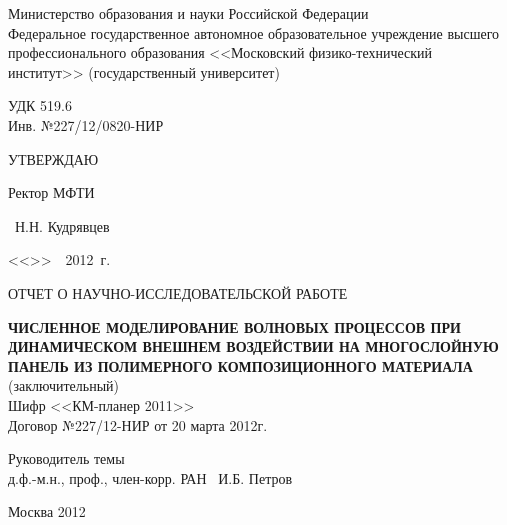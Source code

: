 \begin{titlepage}
\newpage

\begin{center}
Министерство образования и науки Российской Федерации\\
Федеральное государственное автономное образовательное учреждение высшего профессионального образования <<Московский физико-технический институт>> (государственный университет)\\
\end{center}

\vspace{0.5em}

\noindent
\begin{minipage}[t]{0.5\textwidth}
УДК 519.6\\
Инв. №227/12/0820-НИР
\end{minipage}
\begin{minipage}[t]{0.5\textwidth}
\centering УТВЕРЖДАЮ
\begin{flushleft}
Ректор МФТИ
\end{flushleft}
\begin{flushright}
\hrulefill ~Н.Н. Кудрявцев
\end{flushright}
\begin{flushright}
<<\underline{\hspace{10 mm}}>>\ \hrulefill\ 2012~г.
\end{flushright}
\end{minipage}

\vspace{2em}

\begin{center}
ОТЧЕТ О НАУЧНО-ИССЛЕДОВАТЕЛЬСКОЙ РАБОТЕ
\end{center}

\vspace{0.5em}

\begin{center}
\textsc{\textbf{ЧИСЛЕННОЕ МОДЕЛИРОВАНИЕ ВОЛНОВЫХ ПРОЦЕССОВ ПРИ ДИНАМИЧЕСКОМ ВНЕШНЕМ ВОЗДЕЙСТВИИ НА МНОГОСЛОЙНУЮ ПАНЕЛЬ ИЗ ПОЛИМЕРНОГО КОМПОЗИЦИОННОГО МАТЕРИАЛА}} \\
(заключительный) \\
Шифр <<КМ-планер 2011>> \\
Договор №227/12-НИР от 20 марта 2012г.
\end{center}

\vspace{2em}

\begin{flushleft}
\vspace{1.5em}
Руководитель темы \\
д.ф.-м.н., проф., член-корр. РАН \hrulefill ~И.Б. Петров
\end{flushleft}

\vspace{\fill}
\begin{center}
Москва 2012
\end{center}

\end{titlepage}
